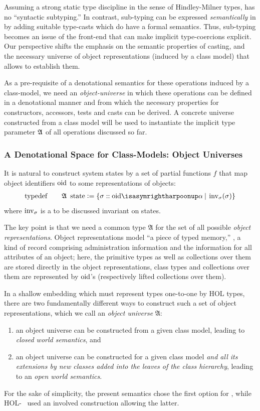 Assuming a strong static type discipline in the sense of
Hindley-Milner types,  \FOCL has no ``syntactic
subtyping.''  In contrast, sub-typing can be expressed
\emph{semantically} in  \FOCL by adding suitable type-casts which do
have a formal semantics. Thus, sub-typing becomes an issue of the front-end 
that can make implicit type-coercions explicit. Our perspective shifts the 
emphasis on the semantic properties of casting, and the necessary universe of 
object representations (induced by a class model) that allows to establish
them.

As a pre-requisite of a denotational semantics for these operations induced
by a class-model, we need an \emph{object-universe} in which these operations can
be defined in a denotational manner and from which the necessary properties
for constructors, accessors, tests and casts
can be derived. A concrete universe constructed from a class model will be
used to instantiate the implicit type parameter $\mathfrak{A}$ of all \OCL operations
discussed so far.

\subsubsection{A Denotational Space for Class-Models: Object Universes}

It is natural to construct system states by a set of partial functions
$f$ that map object identifiers $\mathrm{oid}$ to some representations of
objects:
\begin{gather}
       \typedef \qquad \mathfrak{A}~\state{} \defeq \{\sigma ::
        \oid \isasymrightharpoonup \alpha \ap|\ap \inv_\sigma(\sigma) \}
\end{gather}
where $\operatorname{inv}_\sigma$ is a to be discussed invariant on states.

The key point is that we need a common type $\mathfrak{A}$ for the set of all
possible \emph{object representations}.  Object representations model
``a piece of typed memory,'' \ie, a kind of record comprising
administration information and the information for all attributes of
an object; here, the primitive types as well as collections over them
are stored directly in the object representations, class types and
collections over them are represented by $\mathrm{oid}$'s (respectively lifted
collections over them).

In a shallow embedding which must represent
\UML types one-to-one by HOL types, there are two fundamentally
different ways to construct such a set of object representations,
which we call an \emph{object universe} $\mathfrak{A}$:
\begin{enumerate}
\item an object universe can be constructed from a given class model,
  leading to \emph{closed world semantics}, and
\item an object universe can be constructed for a given class model
  \emph{and all its extensions by new classes added into the leaves of
    the class hierarchy}, leading to an \emph{open world semantics}.
\end{enumerate}
For the sake of simplicity, the present semantics chose the first option for
 \FOCL, while HOL-\OCL~\cite{brucker.ea:extensible:2008-b}
used an involved construction allowing the latter.

